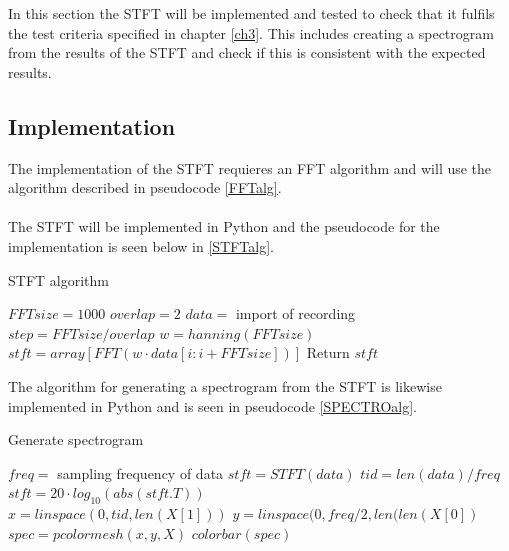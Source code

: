 In this section the STFT will be implemented and tested to check that it fulfils the test criteria specified in chapter \ref{ch3}. This includes creating a spectrogram from the results of the STFT and check if this is consistent with the expected results.
\subsection{Implementation}
The implementation of the STFT requieres an FFT algorithm and will use the algorithm described in pseudocode \ref{FFTalg}.\\\\
The STFT will be implemented in Python and the pseudocode for the implementation is seen below in \ref{STFTalg}.
\begin{algorithm}[H]
\caption{STFT algorithm}
\label{STFTalg}
\begin{algorithmic}[1]
\State $FFTsize=1000$ 
\State $overlap=2$ 
\State $data=$ import of recording \\
\State $step=FFTsize/overlap$
\State $w=hanning(FFTsize)$ 
\State $stft = array[FFT(w\cdot data[i:i+FFTsize])]$
\EndFor
\State Return $stft$
\EndProcedure
\end{algorithmic}
\end{algorithm}
The algorithm for generating a spectrogram from the STFT is likewise implemented in Python and is seen in pseudocode \ref{SPECTROalg}.
\begin{algorithm}[H]
\caption{Generate spectrogram}
\label{SPECTROalg}
\begin{algorithmic}[1]
\State $freq=$ sampling frequency of data
\State $stft=STFT(data)$ 
\State $tid=len(data)/freq$ 
\State $stft=20\cdot log_{10}(abs(stft.T))$ \\
\State $x=linspace(0,tid,len(X[1]))$ 
\State $y=linspace(0,freq/2,len(len(X[0])$ \\
\State $spec=pcolormesh(x,y,X)$ 
\State $colorbar(spec)$ 
\end{algorithmic}
\end{algorithm}
